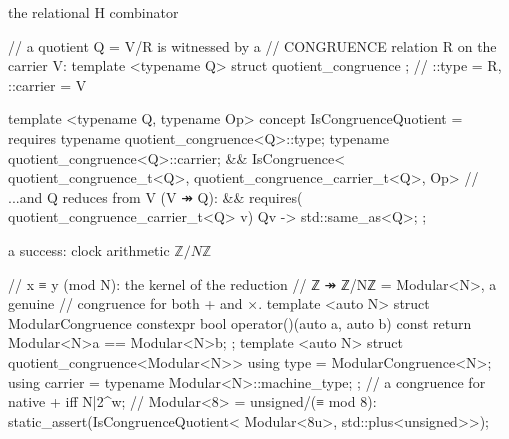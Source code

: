 \documentclass[11pt, a4paper]{article}
\begin{document}
\begin{listing}[!ht]
\caption{The relational H (quotient) leg: a quotient $Q = V/R$ is declared by naming its \emph{congruence} relation $R$ on the carrier $V$ (left), and  $= \mathbb{Z}/N\mathbb{Z}$ names the mod-$N$ relation as its congruence (right).   checks that $R$ is an equivalence preserved by the operation, so  holds --- on the machine carrier $\mathbb{Z}/2^{w}\mathbb{Z}$ this needs $N$ a power of two ($N=8$ here), so that native wraparound agrees with mod-$N$ reduction --- and the certificate rides the relation.  Carriers whose pre-quotient is not itself a reified carrier (the dual numbers $\mathbb{D} = F[\varepsilon]/(\varepsilon^2)$, $\mathbb{C}$) instead declare a trait-propagation base; the P (product) and S (subalgebra) legs mirror the same shape.}
\label{lst:hsp-combinators}
\noindent
\begin{minipage}[t]{0.52\linewidth}
the relational H combinator
\begin{cpp}
// a quotient Q = V/R is witnessed by a
// CONGRUENCE relation R on the carrier V:
template <typename Q>
struct quotient_congruence {};
//   ::type = R,  ::carrier = V

template <typename Q, typename Op>
concept IsCongruenceQuotient =
  requires {
    typename quotient_congruence<Q>::type;
    typename quotient_congruence<Q>::carrier;
  } && IsCongruence<
    quotient_congruence_t<Q>,
    quotient_congruence_carrier_t<Q>, Op>
  // ...and Q reduces from V (V ↠ Q):
  && requires(
       quotient_congruence_carrier_t<Q> v)
     { { Q{v} } -> std::same_as<Q>; };
\end{cpp}
\end{minipage}\hfill
\begin{minipage}[t]{0.45\linewidth}
a success: clock arithmetic $\mathbb{Z}/N\mathbb{Z}$
\begin{cpp}
// x ≡ y (mod N): the kernel of the reduction
// ℤ ↠ ℤ/Nℤ = Modular<N>, a genuine
// congruence for both + and ×.
template <auto N>
struct ModularCongruence {
  constexpr bool operator()(auto a, auto b)
  const { return Modular<N>{a}
              == Modular<N>{b}; }
};
template <auto N>
struct quotient_congruence<Modular<N>> {
  using type    = ModularCongruence<N>;
  using carrier =
    typename Modular<N>::machine_type;
};
// a congruence for native + iff N|2^w;
// Modular<8> = unsigned/(≡ mod 8):
static_assert(IsCongruenceQuotient<
    Modular<8u>, std::plus<unsigned>>);
\end{cpp}
\end{minipage}
\end{listing}
\end{document}
